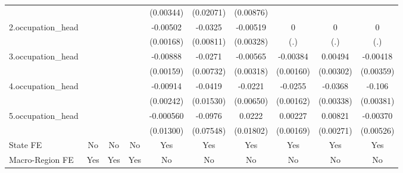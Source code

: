 \begin{table}[htbp]
\begin{tabular}{l*{9}{c}}
            &                     &                     &                     &   (0.00344)         &   (0.02071)         &   (0.00876)         &                     &                     &                     \\
2.occupation\_head&                     &                     &                     &    -0.00502\sym{***}&     -0.0325\sym{***}&    -0.00519         &           0         &           0         &           0         \\
            &                     &                     &                     &   (0.00168)         &   (0.00811)         &   (0.00328)         &         (.)         &         (.)         &         (.)         \\
3.occupation\_head&                     &                     &                     &    -0.00888\sym{***}&     -0.0271\sym{***}&    -0.00565\sym{*}  &    -0.00384\sym{**} &     0.00494         &    -0.00418         \\
            &                     &                     &                     &   (0.00159)         &   (0.00732)         &   (0.00318)         &   (0.00160)         &   (0.00302)         &   (0.00359)         \\
4.occupation\_head&                     &                     &                     &    -0.00914\sym{***}&     -0.0419\sym{***}&     -0.0221\sym{***}&     -0.0255\sym{***}&     -0.0368\sym{***}&      -0.106\sym{***}\\
            &                     &                     &                     &   (0.00242)         &   (0.01530)         &   (0.00650)         &   (0.00162)         &   (0.00338)         &   (0.00381)         \\
5.occupation\_head&                     &                     &                     &   -0.000560         &     -0.0976         &      0.0222         &     0.00227         &     0.00821\sym{***}&    -0.00370         \\
            &                     &                     &                     &   (0.01300)         &   (0.07548)         &   (0.01802)         &   (0.00169)         &   (0.00271)         &   (0.00526)         \\
State FE    &          No         &          No         &          No         &         Yes         &         Yes         &         Yes         &         Yes         &         Yes         &         Yes         \\
Macro-Region FE &         Yes         &         Yes         &         Yes         &          No         &          No         &          No         &          No         &          No         &          No         \\

\end{tabular}
\end{table}
